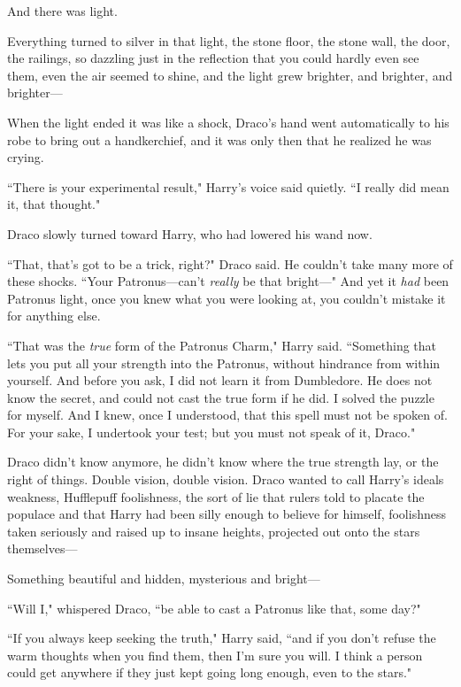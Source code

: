 And there was light.

Everything turned to silver in that light, the stone floor, the stone wall, the door, the railings, so dazzling just in the reflection that you could hardly even see them, even the air seemed to shine, and the light grew brighter, and brighter, and brighter—

When the light ended it was like a shock, Draco's hand went automatically to his robe to bring out a handkerchief, and it was only then that he realized he was crying.

``There is your experimental result," Harry's voice said quietly. ``I really did mean it, that thought."

Draco slowly turned toward Harry, who had lowered his wand now.

``That, that's got to be a trick, right?" Draco said. He couldn't take many more of these shocks. ``Your Patronus—can't \emph{really} be that bright—" And yet it \emph{had} been Patronus light, once you knew what you were looking at, you couldn't mistake it for anything else.

``That was the \emph{true} form of the Patronus Charm," Harry said. ``Something that lets you put all your strength into the Patronus, without hindrance from within yourself. And before you ask, I did not learn it from Dumbledore. He does not know the secret, and could not cast the true form if he did. I solved the puzzle for myself. And I knew, once I understood, that this spell must not be spoken of. For your sake, I undertook your test; but you must not speak of it, Draco."

Draco didn't know anymore, he didn't know where the true strength lay, or the right of things. Double vision, double vision. Draco wanted to call Harry's ideals weakness, Hufflepuff foolishness, the sort of lie that rulers told to placate the populace and that Harry had been silly enough to believe for himself, foolishness taken seriously and raised up to insane heights, projected out onto the stars themselves—

Something beautiful and hidden, mysterious and bright—

``Will I," whispered Draco, ``be able to cast a Patronus like that, some day?"

``If you always keep seeking the truth," Harry said, ``and if you don't refuse the warm thoughts when you find them, then I'm sure you will. I think a person could get anywhere if they just kept going long enough, even to the stars."


